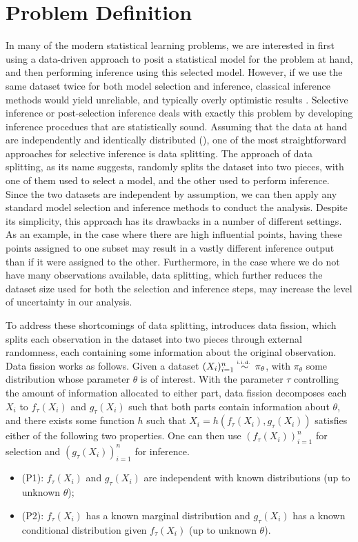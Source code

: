 \section{Problem Definition}\label{sec:problem_def}
In many of the modern statistical learning problems, we are interested in first using a data-driven approach to posit a statistical model for the problem at hand, and then performing inference using this selected model. However, if we use the same dataset twice for both model selection and inference, classical inference methods would yield unreliable, and typically overly optimistic results \citep{hong2018overfitting}. Selective inference or post-selection inference deals with exactly this problem by developing inference procedues that are statistically sound. Assuming that the data at hand are independently and identically distributed (\iid), one of the most straightforward approaches for selective inference is data splitting. The approach of data splitting, as its name suggests, randomly splits the dataset into two pieces, with one of them used to select a model, and the other used to perform inference. Since the two datasets are independent by assumption, we can then apply any standard model selection and inference methods to conduct the analysis. Despite its simplicity, this approach has its drawbacks in a number of different settings. As an example, in the case where there are high influential points, having these points assigned to one subset may result in a vastly different inference output than if it were assigned to the other. Furthermore, in the case where we do not have many observations available, data splitting, which further reduces the dataset size used for both the selection and inference steps, may increase the level of uncertainty in our analysis.

To address these shortcomings of data splitting, \cite{leiner2022data} introduces data fission, which splits each observation in the dataset into two pieces through external randomness, each containing some information about the original observation. Data fission works as follows. Given a dataset $(X_i)_{i=1}^n \overset{\textrm{\tiny i.i.d.\ }}{\sim} \pi_\theta$, with $\pi_\theta$ some distribution whose parameter $\theta$ is of interest. With the parameter $\tau$ controlling the amount of information allocated to either part, data fission decomposes each $X_i$ to $f_\tau(X_i)$ and $g_\tau(X_i)$ such that both parts contain information about $\theta$, and there exists some function $h$ such that $X_i = h(f_\tau(X_i), g_\tau(X_i))$ satisfies either of the following two properties. One can then use $\left(f_\tau(X_i)\right)_{i=1}^n$ for selection and $\left(g_\tau(X_i)\right)_{i=1}^n$ for inference.
\begin{itemize}
\item (P1): $f_\tau(X_i)$ and $g_\tau(X_i)$ are independent with known distributions (up to unknown $\theta$);
\item (P2): $f_\tau(X_i)$ has a known marginal distribution and $g_\tau(X_i)$ has a known conditional distribution given $f_\tau(X_i)$ (up to unknown $\theta$).
\end{itemize}

